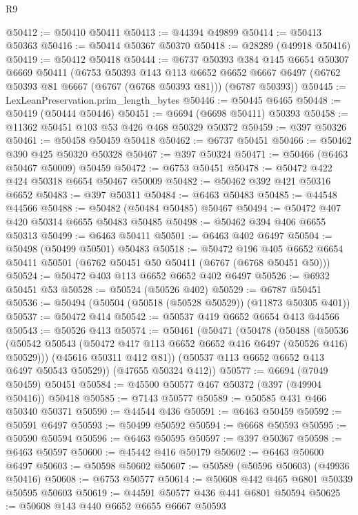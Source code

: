 \begin{lexlean}{R9}
\begin{coremodule}
@50412 := @50410 @50411
@50413 := @44394 @49899
@50414 := @50413 @50363
@50416 := @50414 @50367 @50370
@50418 := @28289 (@49918 @50416)
@50419 := @50412 @50418
@50444 := @6737
    @50393
    @384
    @145
    @6654
    @50307
    @6669
    @50411
    (@6753
      @50393
      @143
      @113
      @6652
      @6652
      @6667
      @6497
      (@6762 @50393 @81 @6667 (@6767 (@6768 @50393 @81)))
      (@6787 @50393))
@50445 := LexLeanPreservation.prim_length_bytes
@50446 := @50445 @6465
@50448 := @50419 (@50444 @50446)
@50451 := @6694 (@6698 @50411) @50393
@50458 := @11362 @50451 @103 @53 @426 @468 @50329 @50372
@50459 := @397 @50326
@50461 := @50458 @50459 @50418
@50462 := @6737 @50451
@50466 := @50462 @390 @425 @50320 @50328
@50467 := @397 @50324
@50471 := @50466 (@6463 @50467 @50009) @50459
@50472 := @6753 @50451
@50478 := @50472 @422 @424 @50318 @6654 @50467 @50009
@50482 := @50462 @392 @421 @50316 @6652
@50483 := @397 @50311
@50484 := @6463 @50483
@50485 := @44548 @44566
@50488 := @50482 (@50484 @50485) @50467
@50494 := @50472 @407 @420 @50314 @6655 @50483 @50485
@50498 := @50462 @394 @406 @6655 @50313
@50499 := @6463 @50411
@50501 := @6463 @402 @6497
@50504 := @50498 (@50499 @50501) @50483
@50518 := @50472
    @196
    @405
    @6652
    @6654
    @50411
    @50501
    (@6762 @50451 @50 @50411 (@6767 (@6768 @50451 @50)))
@50524 := @50472 @403 @113 @6652 @6652 @402 @6497
@50526 := @6932 @50451 @53
@50528 := @50524 (@50526 @402)
@50529 := @6787 @50451
@50536 := @50494 (@50504 (@50518 (@50528 @50529)) (@11873 @50305 @401))
@50537 := @50472 @414
@50542 := @50537 @419 @6652 @6654 @413 @44566
@50543 := @50526 @413
@50574 := @50461
    (@50471
      (@50478
        (@50488
          (@50536 (@50542 @50543 (@50472 @417 @113 @6652 @6652 @416 @6497 (@50526 @416) @50529)))
          (@45616 @50311 @412 @81))
        (@50537 @113 @6652 @6652 @413 @6497 @50543 @50529))
      (@47655 @50324 @412))
@50577 := @6694 (@7049 @50459) @50451
@50584 := @45500 @50577 @467 @50372 (@397 (@49904 @50416)) @50418
@50585 := @7143 @50577
@50589 := @50585 @431 @466 @50340 @50371
@50590 := @44544 @436
@50591 := @6463 @50459
@50592 := @50591 @6497
@50593 := @50499 @50592
@50594 := @6668 @50593
@50595 := @50590 @50594
@50596 := @6463 @50595
@50597 := @397 @50367
@50598 := @6463 @50597
@50600 := @45442 @416 @50179
@50602 := @6463 @50600 @6497
@50603 := @50598 @50602
@50607 := @50589 (@50596 @50603) (@49936 @50416)
@50608 := @6753 @50577
@50614 := @50608 @442 @465 @6801 @50339 @50595 @50603
@50619 := @44591 @50577 @436 @441 @6801 @50594
@50625 := @50608 @143 @440 @6652 @6655 @6667 @50593

\end{coremodule}
\end{lexlean}
